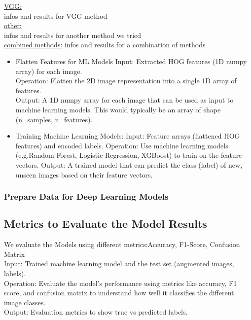 \documentclass{article}
\begin{document}
\vspace{0.5cm}
    

\underline{VGG:}\\
infos and results for VGG-method
\\

\underline{other:}\\
infos and results for another method we tried
\\

\underline{combined methods:}
infos and results for a combination of methods
\begin{itemize}
    \item Flatten Features for ML Models
    Input: Extracted HOG features (1D numpy array) for each image.\\
    Operation: Flatten the 2D image representation into a single 1D array of features.\\
    Output: A 1D numpy array for each image that can be used as input to machine learning models. This would typically be an array of shape (n\_samples, n\_features).\\
    \item Training Machine Learning Models:
    Input: Feature arrays (flattened HOG features) and encoded labels.
    Operation: Use machine learning models (e.g.Random Forest, Logistic Regression, XGBoost) to train on the feature vectors.
    Output: A trained model that can predict the class (label) of new, unseen images based on their feature vectors.
\end{itemize}

\subsubsection{Prepare Data for Deep Learning Models}

\subsection{Metrics to Evaluate the Model Results}
We evaluate the Models using different metrics:Accuracy, F1-Score, Confusion Matrix\\
Input: Trained machine learning model and the test set (augmented images, labels).\\
Operation: Evaluate the model's performance using metrics like accuracy, F1 score, and confusion matrix to understand how well it classifies the different image classes.\\
Output: Evaluation metrics to show true vs predicted labels.
\end{document}
